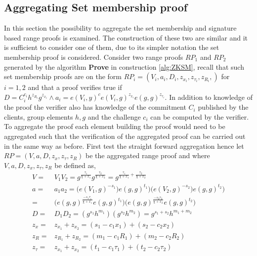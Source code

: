 \subsection*{Aggregating Set membership proof}
In this section the possibility to aggregate the set membership and signature based range proofs  is examined.  The construction of these two are similar and it is sufficient to consider one of them, due to  its simpler notation the set membership proof is considered. Consider two range proofs $RP_1$ and $RP_2$ generated by the algorithm \textbf{Prove} in construction \ref{alg:ZKSM}, recall that such set membership proofs are on the form $RP_i = (V_i,a_i,D_i,z_{x_i},z_{\tau _i},z_{R_i}, )$ for $i=1,2$ and that a proof verifies true if  $D=C_i^{c_i}h^{z_{R_i}}g^{z_{x_i}}\wedge a_i = e(V_i,y)^ce(V_i,g)^{z_{x_i}}e(g,g)^{z_{\tau_i}}$. In addition to knowledge of the proof the verifier also has knowledge of the commitment $C_i$ published by the clients, group elements $h,g$  and the challenge $c_i$ can be computed by the verifier. To aggregate the proof each element building the proof would need to be aggregated such that the verification of the aggregated proof can be carried out in the same way as before. First test the straight forward aggregation hence let $RP = (V,a,D,z_{x},z_{\tau },z_{R})$ be the aggregated range proof and  where $V, a, D,z_{x},z_{\tau },z_{R}$ be defined as,
\begin{equation}
\begin{aligned}
\label{eq:naiveAgg}
V =& V_1V_2 = g^{\frac{\tau_1}{\chi + x_1}}g^{\frac{\tau_2}{\chi + x_2}}  = g^{\frac{\tau_1}{\chi + x_1} + \frac{\tau_2}{\chi + x_2}}  \\
a =& a_1a_2 = \big(e(V_1,g)^{-s_1})e(g,g)^{t_1}\big)  \big(e(V_2,g)^{-s_2})e(g,g)^{t_2}\big) \\
=&  \big( e(g,g)^{\frac{-s_1\tau_i}{\chi+x_1}}e(g,g)^{t_1}\big) \big( e(g,g)^{\frac{-s_2\tau_2}{\chi+x_2}}e(g,g)^{t_2}\big) \\
D =& D_1D_2 = ( g^{s_1}h^{m_1} ) (g^{s_2} h^{m_2}) = g^{s_1+s_2}h^{m_1+m_2}\\
z_x =& z_{x_1} + z_{x_2} = (s_1-c_1x_1)+(s_2-c_2x_2)\\
z_R =& z_{R_1} + z_{R_2} = (m_1-c_1R_1)+(m_2-c_2R_2)\\
z_\tau =& z_{x_1} + z_{x_2} = (t_1-c_1\tau_1)+(t_2-c_2\tau_2)\\ 
\end{aligned} 
\end{equation}
